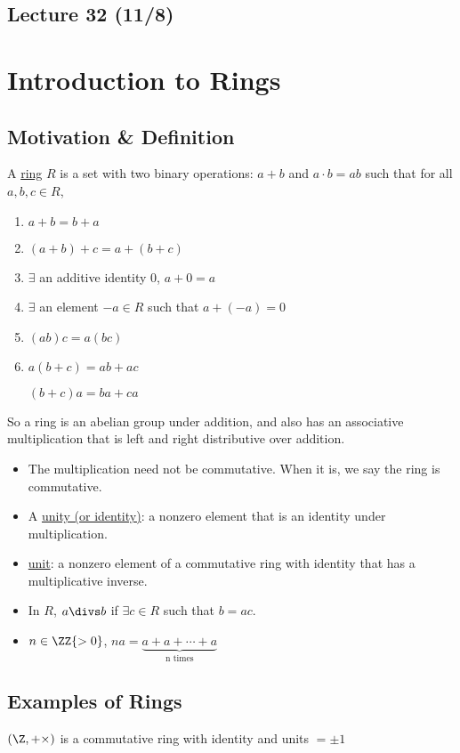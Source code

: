 \subsection*{Lecture 32 (11/8)} %
\section{Introduction to Rings}
\subsection{Motivation \& Definition}
\begin{definition}[Ring]
  A \ul{ring} \(R\) is a set with two binary operations: \(a+b\) and \(a\cdot b=ab\) such that for all \(a,b,c\in R\),
  \begin{enumerate}
    \item \(a+b = b+a\)
    \item \((a+b)+c = a+(b+c)\)
    \item \(\exists\) an additive identity \(0\), \(a+0 = a\)
    \item \(\exists\) an element \(-a\in R\) such that \(a+(-a)=0\)
    \item \((ab)c = a(bc)\)
    \item \(a(b+c) = ab+ac\)

    \((b+c)a = ba+ca\)
  \end{enumerate}
\end{definition}

So a ring is an abelian group under addition, and also has an associative multiplication that is left and right distributive over addition.
\begin{itemize}
  \item The multiplication need not be commutative. When it is, we say the ring is commutative.
  \item A \ul{unity (or identity)}: a nonzero element that is an identity under multiplication.
  \item \ul{unit}: a nonzero element of a commutative ring with identity that has a multiplicative inverse.
  \item In \(R\), \(a\divs b\) if \(\exists c\in R\) such that \(b=ac\).
  \item \(n\in \ZZ{>0}\), \(na = \underbrace{a+a+\cdots+a}_{\text{n times}}\)
\end{itemize}

\subsection{Examples of Rings}
\begin{example}
  \((\Z, +\times)\) is a commutative ring with identity and units \(=\pm 1\)
\end{example}

